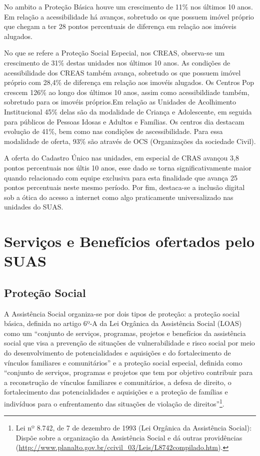 \documentclass[
  brazilian]{report}
\begin{document}
No ambito a Proteção Básica houve um crescimento de 11\% nos últimos 10
anos. Em relação a acessibilidade há avanços, sobretudo os que possuem
imóvel próprio que chegam a ter 28 pontos percentuais de diferença em
relação aos imóveis alugados.

No que se refere a Proteção Social Especial, nos CREAS, observa-se um
crescimento de 31\% destas unidades nos últimos 10 anos. As condições de
acessibilidade dos CREAS também avança, sobretudo os que possuem imóvel
próprio com 28,4\% de diferença em relação aos imovéis alugados. Os
Centros Pop crescem 126\% ao longo dos últimos 10 anos, assim como
acessibildiade também, sobretudo para os imovéis próprios.Em relação as
Unidades de Acolhimento Institucional 45\% delas são da modalidade de
Criança e Adolescente, em seguida para públicos de Pessoas Idosas e
Adultos e Famílias. Os centros dia destacam evolução de 41\%, bem como
nas condições de ascessibilidade. Para essa modalidade de oferta, 93\%
são através de OCS (Organizações da sociedade Civil).

A oferta do Cadastro Único nas unidades, em especial de CRAS avançou 3,8
pontos percentuais nos últis 10 anos, esse dado se torna
significativamente maior quando relacionado com equipe exclusiva para
esta finalidade que avança 25 pontos percentuais neste mesmo período.
Por fim, destaca-se a inclusão digital sob a ótica do acesso a internet
como algo praticamente universalizado nas unidades do SUAS.

\hypertarget{serviuxe7os-e-benefuxedcios-ofertados-pelo-suas}{%
\chapter{Serviços e Benefícios ofertados pelo
SUAS}\label{serviuxe7os-e-benefuxedcios-ofertados-pelo-suas}}

\hypertarget{proteuxe7uxe3o-social}{%
\section{Proteção Social}\label{proteuxe7uxe3o-social}}

A Assistência Social organiza-se por dois tipos de proteção: a proteção
social básica, definida no artigo 6º-A da Lei Orgânica da Assistência
Social (LOAS) como um ``conjunto de serviços, programas, projetos e
benefícios da assistência social que visa a prevenção de situações de
vulnerabilidade e risco social por meio do desenvolvimento de
potencialidades e aquisições e do fortalecimento de vínculos familiares
e comunitários'' e a proteção social especial, definida como ``conjunto
de serviços, programas e projetos que tem por objetivo contribuir para a
reconstrução de vínculos familiares e comunitários, a defesa de direito,
o fortalecimento das potencialidades e aquisições e a proteção de
famílias e indivíduos para o enfrentamento das situações de violação de
direitos''\footnote{Lei nº 8.742, de 7 de dezembro de 1993 (Lei Orgânica da Assistência Social): Dispõe sobre a organização da Assistência Social e dá outras providências (\url{http://www.planalto.gov.br/ccivil_03/Leis/L8742compilado.htm}).}.
\end{document}

